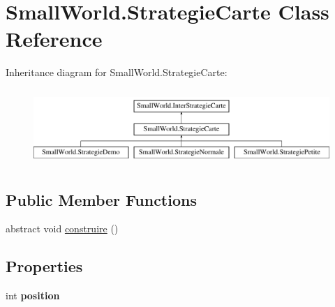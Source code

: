 \hypertarget{class_small_world_1_1_strategie_carte}{\section{Small\-World.\-Strategie\-Carte Class Reference}
\label{class_small_world_1_1_strategie_carte}
}
Inheritance diagram for Small\-World.\-Strategie\-Carte\-:\begin{figure}[H]
\begin{center}
\leavevmode
\includegraphics[height=2.901554cm]{class_small_world_1_1_strategie_carte}
\end{center}
\end{figure}
\subsection*{Public Member Functions}
\begin{DoxyCompactItemize}
\item 
abstract void \hyperlink{class_small_world_1_1_strategie_carte_a705ec27550d4dd65ec9295a851580c63}{construire} ()
\end{DoxyCompactItemize}
\subsection*{Properties}
\begin{DoxyCompactItemize}
\item 
\hypertarget{class_small_world_1_1_strategie_carte_a146ad39467e6dd3209997f0ceff95fd4}{int {\bfseries position}}\label{class_small_world_1_1_strategie_carte_a146ad39467e6dd3209997f0ceff95fd4}

\end{DoxyCompactItemize}


